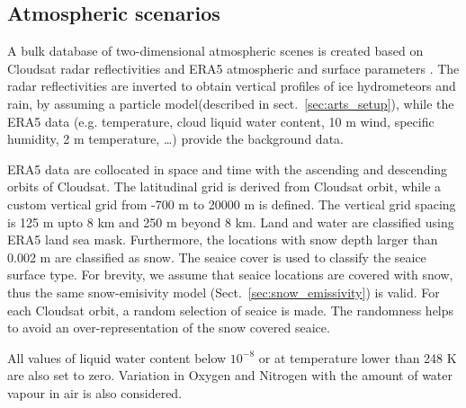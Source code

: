 \documentclass[amt, manuscript]{copernicus}
\begin{document}



\subsection{Atmospheric scenarios}
\label{sec:atm_scenes}

A bulk database of two-dimensional atmospheric scenes is created based on Cloudsat radar reflectivities \citep{marchand:hydro:08} and ERA5 atmospheric and surface parameters \citep{era5:18}. The radar reflectivities are inverted to obtain vertical profiles of ice hydrometeors and rain, by assuming a particle model(described in sect.~\ref{sec:arts_setup}), while the ERA5 data (e.g. temperature, cloud liquid water content, 10\,\,m wind, specific humidity, 2\,\,m temperature, \dots) provide the background data.

ERA5 data are collocated in space and time with the ascending and descending orbits of Cloudsat. The latitudinal grid is derived from Cloudsat orbit, while a custom vertical grid from -700\,\,m to 20000\,\,m is defined. The vertical grid spacing is 125\,\,m upto 8\,\,km and 250\,\,m beyond 8\,\,km. Land and water are classified using ERA5 land sea mask. Furthermore, the locations with snow depth larger than 0.002\,\,m are classified as snow. The seaice cover is used to classify the seaice surface type. For brevity, we assume that seaice locations are covered with snow, thus the same snow-emisivity model (Sect.~\ref{sec:snow_emissivity}) is valid. For each Cloudsat orbit, a random selection of seaice is made. The randomness helps to avoid an over-representation of the snow covered seaice. 

All values of liquid water content below $10^{-8}$ or at temperature lower than 248\,\,K are also set to zero. Variation in Oxygen and Nitrogen with the amount of water vapour in air is also considered.  
\end{document}
